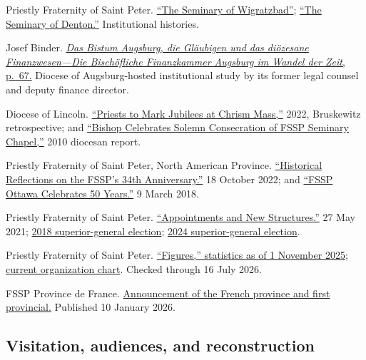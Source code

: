 Priestly Fraternity of Saint Peter. \href{https://www.fssp.org/en/our-seminaries/the-seminary-of-wigratzbad/}{``The Seminary of Wigratzbad''}; \href{https://www.fssp.org/en/our-seminaries/denton/}{``The Seminary of Denton.''} Institutional histories.

Josef Binder. \href{https://bistum-augsburg.de/content/download/250574/file/Abhandlung_Die\%20Bisch\%C3\%B6fliche\%20Finanzkammer\%20Augsburg\%20im\%20Wandel\%20der\%20Zeit.pdf}{\emph{Das Bistum Augsburg, die Gläubigen und das diözesane Finanzwesen---Die Bischöfliche Finanzkammer Augsburg im Wandel der Zeit}, p.~67.} Diocese of Augsburg-hosted institutional study by its former legal counsel and deputy finance director.

Diocese of Lincoln. \href{https://www.lincolndiocese.org/news/diocesan-news/15982-priests-to-mark-jubilees-at-chrism-mass-3}{``Priests to Mark Jubilees at Chrism Mass,''} 2022, Bruskewitz retrospective; and \href{https://www.lincolndiocese.org/directory/clergy/880-rev-james-winter}{``Bishop Celebrates Solemn Consecration of FSSP Seminary Chapel,''} 2010 diocesan report.

Priestly Fraternity of Saint Peter, North American Province. \href{https://fssp.com/fssps-34th-anniversary/}{``Historical Reflections on the FSSP's 34th Anniversary.''} 18 October 2022; and \href{https://fssp.com/fssp-ottawa-celebrates-50-years/}{``FSSP Ottawa Celebrates 50 Years.''} 9 March 2018.

Priestly Fraternity of Saint Peter. \href{https://www.fssp.org/en/appointments-and-new-structures-within-the-fssp/}{``Appointments and New Structures.''} 27 May 2021; \href{https://www.fssp.org/en/a-new-superior-general-for-the-fraternity/}{2018 superior-general election}; \href{https://www.fssp.org/en/election-of-the-superior-general-of-the-fraternity/}{2024 superior-general election}.

Priestly Fraternity of Saint Peter. \href{https://www.fssp.org/en/presentation-2/figures/}{``Figures,'' statistics as of 1 November 2025}; \href{https://www.fssp.org/en/presentation-2/organization-chart/}{current organization chart}. Checked through 16 July 2026.

FSSP Province de France. \href{https://www.fssp.fr/2026/01/15/nomination-et-nouvelle-structure-au-sein-de-la-fraternite-saint-pierre/}{Announcement of the French province and first provincial.} Published 10 January 2026.

\subsection{Visitation, audiences, and reconstruction}

